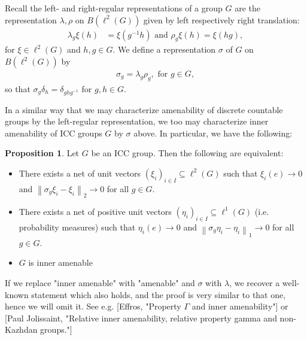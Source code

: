 \documentclass[10pt,oneside,openany,final]{memoir}
\theoremstyle{definition}
\newtheorem{proposition}[theorem]{Proposition}
\theoremstyle{Break}
\newcommand{\lv}{\left\lVert}
\newcommand{\rv}{\right\rVert}
\begin{document}
Recall the left- and right-regular representations of a group $G$ are the representation $\lambda,\rho$ on $B(\ell^2(G))$ given by left respectively right translation: 
\begin{align*}
	\lambda_g \xi(h)&=\xi(g^{-1}h) \text{ and } \rho_g \xi(h)=\xi(hg),
\end{align*}
for $\xi \in \ell^2(G)$ and $h,g \in G$. We define a representation $\sigma$ of $G$ on $B(\ell^2(G))$ by
\begin{align*}
	\sigma_g=\lambda_g \rho_g, \text{ for } g \in G,
\end{align*}
so that $\sigma_g \delta_h=\delta_{ghg^{-1}}$ for $g,h \in G$.

In a similar way that we may characterize amenability of discrete countable groups by the left-regular representation, we too may characterize inner amenability of ICC groups $G$ by $\sigma$ above. In particular, we have the following:
\begin{proposition}
	Let $G$ be an ICC group. Then the following are equivalent:
	\begin{itemize}
		\item There exists a net of unit vectors $(\xi_i)_{i \in I} \subseteq \ell^2(G)$ such that $\xi_i(e) \to 0$ and $\lv \sigma_g \xi_i - \xi_i \rv_2 \to  0$ for all $g \in G$.
		\item There exists a net of positive unit vectors $(\eta_i)_{i \in I} \subseteq \ell^1(G)$ (i.e. probability measures) such that $\eta_i(e) \to 0$ and $\lv \sigma_g \eta_i - \eta_i\rv_1 \to 0$ for all $g \in G$.
		\item $G$ is inner amenable
	\end{itemize}
\end{proposition}
If we replace "inner amenable" with "amenable" and $\sigma$ with $\lambda$, we recover a well-known statement which also holds, and the proof is very similar to that one, hence we will omit it.
See e.g. [Effros, "Property $\Gamma$ and inner amenability"] or [Paul Jolissaint, "Relative inner amenability, relative property gamma and non-Kazhdan groups."]
\end{document}
